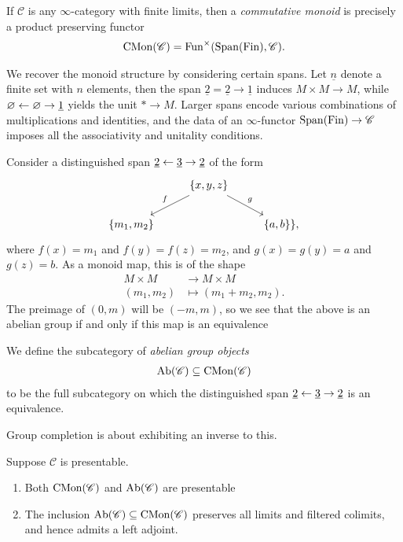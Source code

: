 \documentclass[11pt,openany]{book}
\begin{document}
\begin{definition} If $\mathscr{C}$ is any $\infty$-category with finite limits, then a \textit{commutative monoid} is precisely a product preserving functor
\begin{align*}
    \mathrm{CMon}(\mathscr{C}) = \mathrm{Fun}^\times(\mathrm{Span}(\mathrm{Fin}), \mathscr{C}).
\end{align*}
\end{definition}
We recover the monoid structure by considering certain spans. Let $\underline{n}$ denote a finite set with $n$ elements, then the span $\underline{2} = \underline{2} \to \underline{1}$ induces $M \times M \to M$, while $\varnothing \leftarrow \varnothing \to \underline{1}$ yields the unit $\ast \to M$. Larger spans encode various combinations of multiplications and identities, and the data of an $\infty$-functor $\mathrm{Span}(\mathrm{Fin}) \to \mathscr{C}$ imposes all the associativity and unitality conditions.

Consider a distinguished span $\underline{2} \leftarrow \underline{3} \to \underline{2}$ of the form
\[ \begin{tikzcd}
     & {\{x,y,z\}}\ar[dl,"f" above left]\ar[dr,"g" above right]  & \\
    {\left\{ m_1,m_2 \right\}} &  & {\left\{ a,b \right\}\}},
\end{tikzcd} \]
where $f(x)=m_1$ and $f(y)=f(z)=m_2$, and $g(x)=g(y)=a$ and $g(z)=b$. As a monoid map, this is of the shape
\begin{align*}
    M \times M &\to M \times M \\
    (m_1,m_2) &\mapsto \left( m_1 + m_2, m_2 \right).
\end{align*}
The preimage of $(0,m)$ will be $(-m,m)$, so we see that the above is an abelian group if and only if this map is an equivalence


\begin{definition} We define the subcategory of \textit{abelian group objects}
\begin{align*}
    \mathrm{Ab}(\mathscr{C}) \subseteq \mathrm{CMon}(\mathscr{C})
\end{align*}
to be the full subcategory on which the distinguished span $\underline{2} \leftarrow \underline{3} \to \underline{2}$ is an equivalence.
\end{definition}

Group completion is about exhibiting an inverse to this.

\begin{proposition} Suppose $\mathscr{C}$ is presentable.
\begin{enumerate}
    \item Both $\mathrm{CMon}(\mathscr{C})$ and $\mathrm{Ab}(\mathscr{C})$ are presentable
    \item The inclusion $\mathrm{Ab}(\mathscr{C}) \subseteq \mathrm{CMon}(\mathscr{C})$ preserves all limits and filtered colimits, and hence admits a left adjoint.
\end{enumerate}
\end{proposition}
\end{document}
